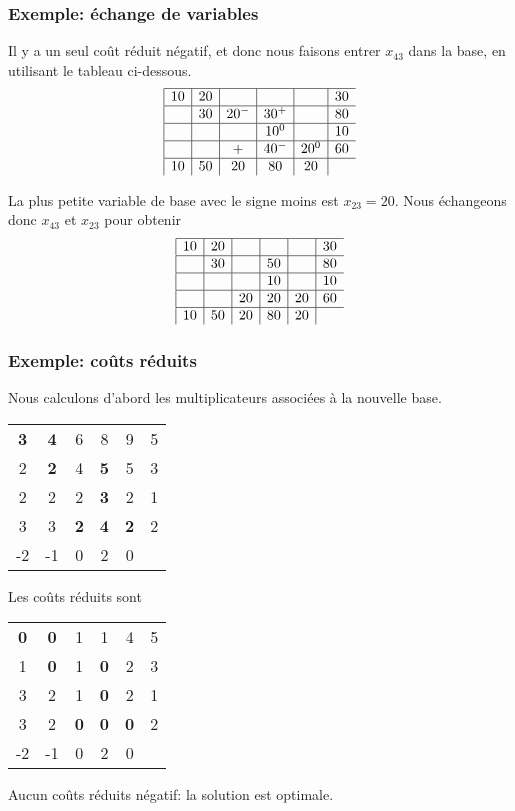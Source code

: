 \documentclass[usepdftitle=false]{beamer}
\begin{document}
\begin{frame}
\frametitle{Exemple: échange de variables}

Il y a un seul coût réduit négatif, et donc nous faisons entrer $x_{43}$ dans la base, en utilisant le tableau ci-dessous.
$$
\begin{array}{|c|c|c|c|c|c}
\hline
10 & 20 & & & & 30 \\
\hline
& 30 & 20^- & 30^+ & & 80 \\
\hline
& & & 10^0 & & 10 \\
\hline
& & + & 40^- & 20^0 & 60 \\
\hline
10 & 50 & 20 & 80 & 20 &
\end{array}
$$

La plus petite variable de base avec le signe moins est $x_{23} = 20$. Nous échangeons donc $x_{43}$ et $x_{23}$ pour obtenir
$$
\begin{array}{|c|c|c|c|c|c}
	\hline
	10 & 20 & & & & 30 \\
	\hline
	& 30 & & 50 & & 80 \\
	\hline
	& & & 10 & & 10 \\
	\hline
	& & 20 & 20 & 20 & 60 \\
	\hline
	10 & 50 & 20 & 80 & 20 &
\end{array}
$$

\end{frame}

\begin{frame}
\frametitle{Exemple: coûts réduits}

Nous calculons d'abord les multiplicateurs associées à la nouvelle base.
\begin{center}
	\begin{tabular}{ccccc|c}
		{\bf 3} & {\bf 4} & 6 & 8 & 9 & 5 \\
		2 & {\bf 2} & 4 & {\bf 5} & 5 & 3 \\
		2 & 2 & 2 & {\bf 3} & 2 & 1 \\
		3 & 3 & {\bf 2} & {\bf 4} & {\bf 2} & 2 \\
		\hline
		-2 & -1 & 0 & 2 & 0 & 
	\end{tabular}
\end{center}
Les coûts réduits sont
\begin{center}
	\begin{tabular}{ccccc|c}
		{\bf 0} & {\bf 0} & 1 & 1 & 4 & 5 \\
		1 & {\bf 0} & 1 & {\bf 0} & 2 & 3 \\
		3 & 2 & 1 & {\bf 0} & 2 & 1 \\
		3 & 2 & {\bf 0} & {\bf 0} & {\bf 0} & 2 \\
		\hline
		-2 & -1 & 0 & 2 & 0 & 
	\end{tabular}
\end{center}
Aucun coûts réduits négatif: la solution est optimale.

\end{frame}
\end{document}
